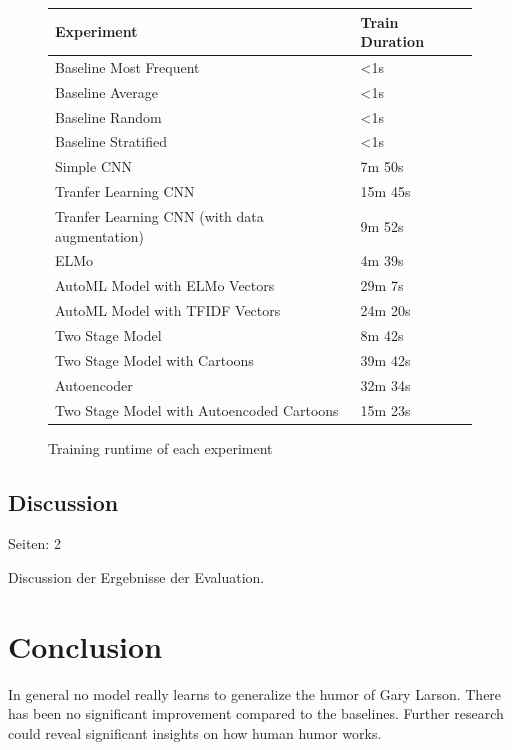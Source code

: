 \documentclass[draft,final,oneside]{vutinfth} %
\begin{document}
\begin{figure}
\centering
\begin{tabular}{|l|l|} 
\hline
\textbf{Experiment}                                    & \textbf{Train Duration}  \\ 
\hline
Baseline Most Frequent                        & \textless{}1s   \\
Baseline Average                              & \textless{}1s   \\
Baseline Random                               & \textless{}1s   \\
Baseline Stratified                           & \textless{}1s   \\
Simple CNN                                    & 7m 50s          \\
Tranfer Learning CNN                          & 15m 45s         \\
Tranfer Learning CNN (with data augmentation) & 9m 52s          \\
ELMo                                          & 4m 39s          \\
AutoML Model with ELMo Vectors                & 29m 7s          \\
AutoML Model with TFIDF Vectors               & 24m 20s         \\
Two Stage Model                               & 8m 42s          \\
Two Stage Model with Cartoons                 & 39m 42s         \\
Autoencoder                                   & 32m 34s         \\
Two Stage Model with Autoencoded Cartoons     & 15m 23s         \\
\hline
\end{tabular}
\caption{Training runtime of each experiment}
\label{trainingruntime}
\end{figure}



\section{Discussion}
Seiten: 2

Discussion der Ergebnisse der Evaluation.

\chapter {Conclusion}

In general no model really learns to generalize the humor of Gary Larson. There has been no significant improvement compared to the baselines. Further research could reveal significant insights on how human humor works.
\end{document}
